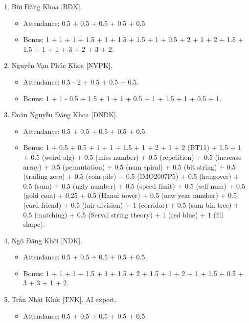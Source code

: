 \documentclass{article}
\begin{document}
\begin{enumerate}
\begin{itemize}
        \item Bonus: 1.5 + 1.5 + 2 + 1 + 0.5 + 1.5 + 1.5 + 3 + 2.
    \end{itemize}
    \item {\sc Bùi Đăng Khoa [BDK].}
    \begin{itemize}
        \item Attendance: 0.5 + 0.5 + 0.5 + 0.5 + 0.5.
        \item Bonus: 1 + 1 + 1 + 1.5 + 1 + 1.5 + 1.5 + 1 + 0.5 + 2 + 1 + 2 + 1.5 + 1.5 + 1 + 1 + 3 + 2 + 3 + 2.
    \end{itemize}
    \item {\sc Nguyễn Vạn Phúc Khoa [NVPK].}
    \begin{itemize}
        \item Attendance: 0.5 - 2 + 0.5 + 0.5 + 0.5.
        \item Bonus: 1 + 1 - 0.5 + 1.5 + 1 + 1 + 0.5 + 1 + 1.5 + 1 + 0.5 + 1.
    \end{itemize}
    \item {\sc Đoàn Nguyễn Đăng Khoa [DNDK].}
    \begin{itemize}
        \item Attendance: 0.5 + 0.5 + 0.5 + 0.5 + 0.5.
        \item Bonus: 1 + 0.5 + 0.5 + 1 + 1 + 1.5 + 1 + 2 + 1 + 2 (BT11) + 1.5 + 1 + 0.5 (weird alg) + 0.5 (miss number) + 0.5 (repetition) + 0.5 (increase array) + 0.5 (permutation) + 0.5 (num spiral) + 0.5 (bit string) + 0.5 (trailing zero) + 0.5 (coin pile) + 0.5 (IMO2007P5) + 0.5 (hangover) + 0.5 (sum) + 0.5 (ugly number) + 0.5 (speed limit) + 0.5 (self num) + 0.5 (gold coin) + 0.25 + 0.5 (Hanoi tower) + 0.5 (new year number) + 0.5 (card friend) + 0.5 (fair division) + 1 (corridor) + 0.5 (sum bin tree) + 0.5 (matching) + 0.5 (Serval string theory) + 1 (red blue) + 1 (fill shape).
    \end{itemize}
    \item {\sc Ngô Đăng Khôi [NDK].}
    \begin{itemize}
        \item Attendance: 0.5 + 0.5 + 0.5 + 0.5 + 0.5.
        \item Bonus: 1 + 1 + 1 + 1.5 + 1 + 1.5 + 2 + 1.5 + 1 + 2 + 1 + 1.5 + 0.5 + 3 + 3 + 1 + 2.
    \end{itemize}
    \item {\sc Trần Nhật Khôi [TNK].} AI expert.
    \begin{itemize}
        \item Attendance: 0.5 + 0.5 + 0.5 + 0.5 + 0.5.

\end{itemize}
\end{enumerate}
\end{document}

